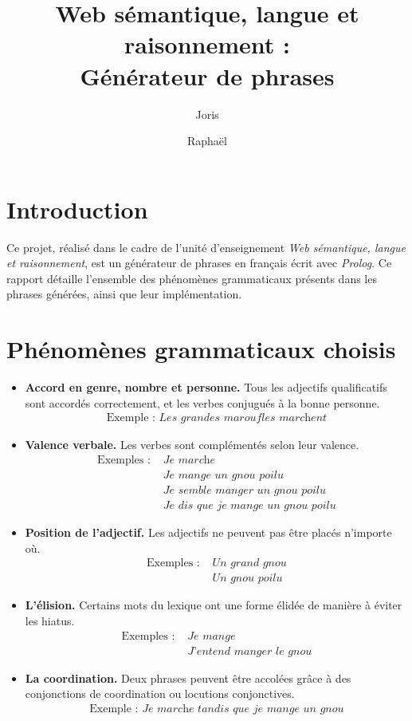 \documentclass[a4paper,10pt]{article}
\title{
	\textbf{Web sémantique, langue et raisonnement :\\
          Générateur de phrases} }
\author{
	Joris \Nom{Pablo} \and Raphaël \Nom{Gaudy} }
\newcommand\Terme\textit
\begin{document}
\maketitle

\section*{Introduction}
Ce projet, réalisé dans le cadre de l'unité d'enseignement \Terme{Web sémantique, langue et raisonnement}, est un générateur de phrases en français écrit avec \Terme{Prolog}. Ce rapport détaille l'ensemble des phénomènes grammaticaux présents dans les phrases générées, ainsi que leur implémentation.

\section{Phénomènes grammaticaux choisis}
\begin{itemize}
\item \textbf{Accord en genre, nombre et personne.} Tous les adjectifs qualificatifs sont accordés correctement, et les verbes conjugués à la bonne personne. 
  \begin{align*}
    \text{Exemple :~} \textit{Les grandes maroufles marchent}
  \end{align*}

\item \textbf{Valence verbale.} Les verbes sont complémentés selon leur valence. 
  \begin{align*}
    \text{Exemples :~} 
    &\textit{Je marche}\\
    &\textit{Je mange un gnou poilu}\\
    &\textit{Je semble manger un gnou poilu}\\
    &\textit{Je dis que je mange un gnou poilu}
  \end{align*}

\item \textbf{Position de l'adjectif.} Les adjectifs ne peuvent pas être placés n'importe où.
  \begin{align*}
    \text{Exemples :~}
    &\textit{Un grand gnou}\\
    &\textit{Un gnou poilu}
  \end{align*}

\item \textbf{L'élision.} Certains mots du lexique ont une forme élidée de manière à éviter les hiatus.
\begin{align*}
  \text{Exemples :~}
  &\textit{Je mange}\\
  &\textit{J'entend manger le gnou}
\end{align*}

\item \textbf{La coordination.} Deux phrases peuvent être accolées grâce à des conjonctions de coordination ou locutions conjonctives.
\begin{align*}
\text{Exemple :~}
\textit{Je marche tandis que je mange un gnou}
\end{align*}
\end{itemize}
\end{document}
